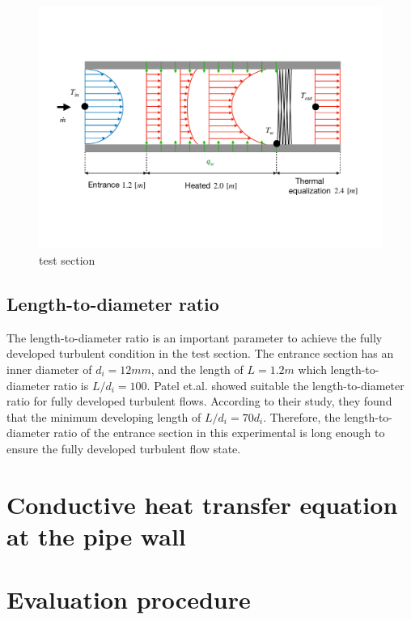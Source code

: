 \documentclass[12pt,oneside]{jbook}
\begin{document}
\begin{figure}[ht]
	\vspace{0zh}
	\begin{center}
		\includegraphics[width=1\linewidth]{fig/testsection.pdf}
		\vspace{-3zh}
		\caption{test section}
		\label{testsection}
	\end{center}
	\vspace{0zh}
\end{figure}

\subsection{Length-to-diameter ratio}
The length-to-diameter ratio is an important parameter to achieve the fully developed turbulent condition in the test section.
The entrance section has an inner diameter of $d_{i}=12mm$, and the length of $L=1.2m$ which length-to-diameter ratio is $L/d_{i}=100$.
Patel et.al.\cite{Zanoun2009} showed suitable the length-to-diameter ratio for fully developed turbulent flows.
According to their study, they found that the minimum developing length of $L/d_{i}=70d_{i}$.
Therefore, the length-to-diameter ratio of the entrance section in this experimental is long enough to ensure the fully developed turbulent flow state.

\section{Conductive heat transfer equation at the pipe wall}
\section{Evaluation procedure}
\end{document}
